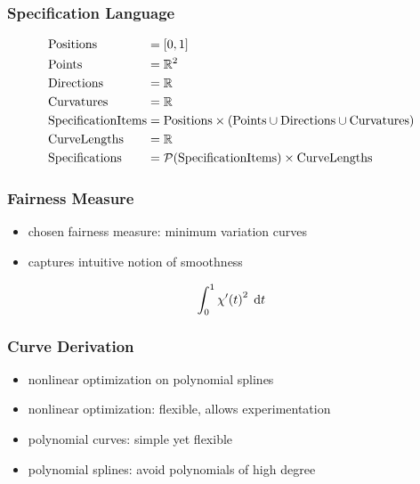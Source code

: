 \documentclass{beamer}
\begin{document}
		\begin{frame}
			\frametitle{Specification Language}
			\begin{equation*}
				\begin{alignedat}{2}
					& \mathrm{Positions}          && = \left[ 0,1 \right]\\
					& \mathrm{Points}             && = \mathbb{R}^{2}\\
					& \mathrm{Directions}         && = \mathbb{R}\\
					& \mathrm{Curvatures}         && = \mathbb{R}\\
					& \mathrm{SpecificationItems} && = \mathrm{Positions} \times \left(\mathrm{Points} \cup \mathrm{Directions} \cup \mathrm{Curvatures}\right)\\
					& \mathrm{CurveLengths}       && = \mathbb{R}\\
					& \mathrm{Specifications}     && = \mathcal{P}\!\left( \mathrm{SpecificationItems} \right) \times \mathrm{CurveLengths}
				\end{alignedat}
			\end{equation*}
		\end{frame}
		
		\begin{frame}
			\frametitle{Fairness Measure}
			\begin{itemize}
				\item chosen fairness measure: minimum variation curves
				\item captures intuitive notion of smoothness
			\end{itemize}
			 \begin{equation*}
				 \int_{0}^{1} \chi'\!\left( t \right)^2 \; \mathrm{d}t
			 \end{equation*}
		\end{frame}
		
		\begin{frame}
			\frametitle{Curve Derivation}
			\begin{itemize}
				\item nonlinear optimization on polynomial splines %
				\item nonlinear optimization: flexible, allows experimentation
				\item polynomial curves: simple yet flexible %
				\item polynomial splines: avoid polynomials of high degree
			\end{itemize}
		\end{frame}
		
\end{document}
